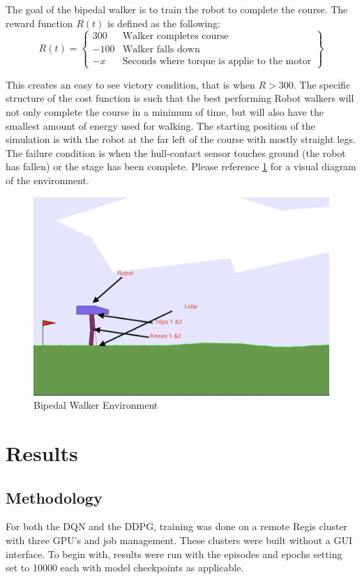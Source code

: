 \documentclass[doc, onecolumn, 12pt]{apa6}
\begin{document}
The goal of the bipedal walker is to train the robot to complete the course. The reward function $R(t)$ is defined as the following: 
\[ R(t) = \left \{\begin{array}{lr}
 300 & \text{Walker completes course} \\
 -100 & \text{Walker falls down} \\
 -x & \text{Seconds where torque is applie to the motor} 
\end{array}\right\}  \]

This creates an easy to see victory condition, that is when $R> 300$. The specific structure of the cost function is such that the best performing Robot walkers will not only complete the course in a minimum of time, but will also have the smallest amount of energy used for walking.
The starting position of the simulation is with the robot at the far left of the course with mostly straight legs. The failure condition is when the hull-contact sensor touches ground (the robot has fallen) or the stage has been complete.  Please reference \ref{biped} for a visual diagram of the environment. 

\begin{figure}[H]
\label{biped}
\caption{Bipedal Walker Environment}
\includegraphics[width = \textwidth]{bipedal.png}
\end{figure} 
\FloatBarrier
\clearpage
\section{Results}
\subsection{Methodology}
For both the DQN and the DDPG, training was done on a remote Regis cluster with three GPU's and job management. These clusters were built without a GUI interface. To begin with, results were run with the episodes and epochs setting set to 10000 each with model checkpoints as applicable.
\end{document}
